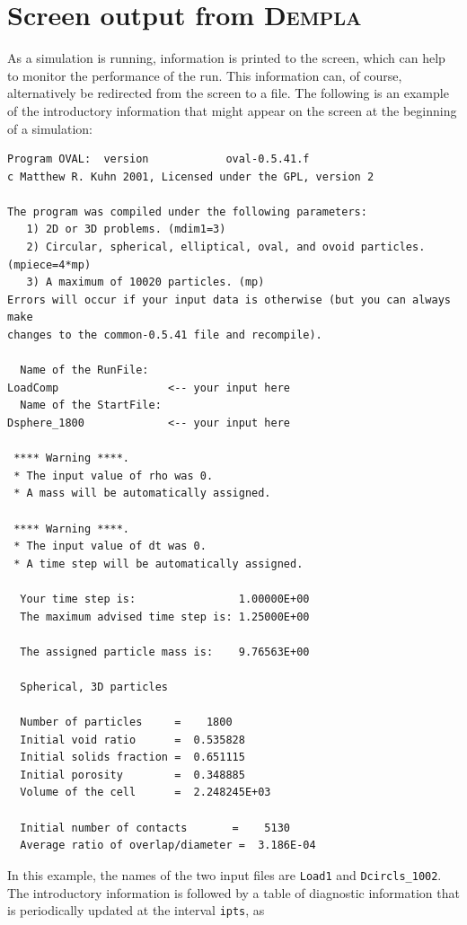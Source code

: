 \documentclass[letterpaper,11pt]{article}
\newcommand{\Dempla}{\textsc{Dempla}}
\begin{document}
\section{Screen output from \Dempla}\label{sec:ScreenOval}
As a simulation is running, information is printed to the screen, which
can help to monitor the performance of the run.
This information can, of course, 
alternatively be redirected from the screen 
to a file.
The following is an example of the introductory information that might
appear on the screen at the beginning of a simulation:
\par
\footnotesize
\begin{verbatim}
Program OVAL:  version            oval-0.5.41.f
c Matthew R. Kuhn 2001, Licensed under the GPL, version 2

The program was compiled under the following parameters:
   1) 2D or 3D problems. (mdim1=3)
   2) Circular, spherical, elliptical, oval, and ovoid particles. (mpiece=4*mp)
   3) A maximum of 10020 particles. (mp)
Errors will occur if your input data is otherwise (but you can always make
changes to the common-0.5.41 file and recompile).
  
  Name of the RunFile:
LoadComp                 <-- your input here
  Name of the StartFile:
Dsphere_1800             <-- your input here
  
 **** Warning ****.
 * The input value of rho was 0.
 * A mass will be automatically assigned.
  
 **** Warning ****.
 * The input value of dt was 0.
 * A time step will be automatically assigned.

  Your time step is:                1.00000E+00
  The maximum advised time step is: 1.25000E+00

  The assigned particle mass is:    9.76563E+00

  Spherical, 3D particles

  Number of particles     =    1800
  Initial void ratio      =  0.535828
  Initial solids fraction =  0.651115
  Initial porosity        =  0.348885
  Volume of the cell      =  2.248245E+03

  Initial number of contacts       =    5130
  Average ratio of overlap/diameter =  3.186E-04
\end{verbatim}
\normalsize
\par
In this example, the names of the two input files are \texttt{Load1}
and \texttt{Dcircls\_1002}.
The introductory information is followed by a table of diagnostic
information that is periodically updated at the interval \texttt{ipts}, as
\end{document}
